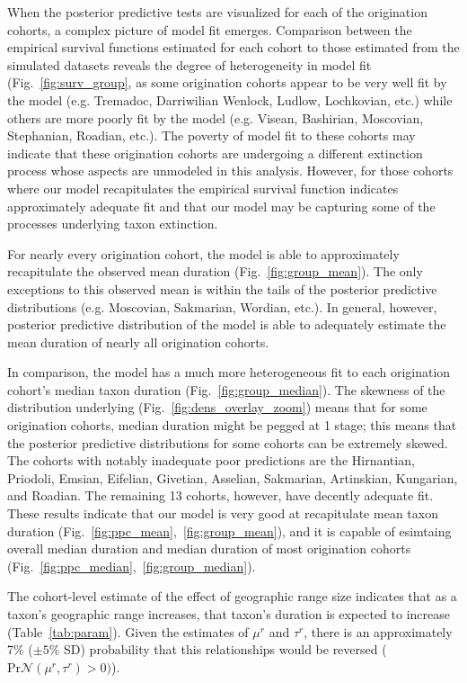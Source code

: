 \documentclass[11pt]{article}
\begin{document}
When the posterior predictive tests are visualized for each of the origination cohorts, a complex picture of model fit emerges. Comparison between the empirical survival functions estimated for each cohort to those estimated from the simulated datasets reveals the degree of heterogeneity in model fit (Fig.~\ref{fig:surv_group}, as some origination cohorts appear to be very well fit by the model (e.g. Tremadoc, Darriwilian Wenlock, Ludlow, Lochkovian, etc.) while others are more poorly fit by the model (e.g. Visean, Bashirian, Moscovian, Stephanian, Roadian, etc.). The poverty of model fit to these cohorts may indicate that these origination cohorts are undergoing a different extinction process whose aspects are unmodeled in this analysis. However, for those cohorts where our model recapitulates the empirical survival function indicates approximately adequate fit and that our model may be capturing some of the processes underlying taxon extinction.

For nearly every origination cohort, the model is able to approximately recapitulate the observed mean duration (Fig.~\ref{fig:group_mean}). The only exceptions to this observed mean is within the tails of the posterior predictive distributions (e.g. Moscovian, Sakmarian, Wordian, etc.). In general, however, posterior predictive distribution of the model is able to adequately estimate the mean duration of nearly all origination cohorts.

In comparison, the model has a much more heterogeneous fit to each origination cohort's median taxon duration (Fig.~\ref{fig:group_median}). The skewness of the distribution underlying (Fig.~\ref{fig:dens_overlay_zoom}) means that for some origination cohorts, median duration might be pegged at 1 stage; this means that the posterior predictive distributions for some cohorts can be extremely skewed. The cohorts with notably inadequate poor predictions are the Hirnantian, Priodoli, Emsian, Eifelian, Givetian, Asselian, Sakmarian, Artinskian, Kungarian, and Roadian. The remaining 13 cohorts, however, have decently adequate fit. These results indicate that our model is very good at recapitulate mean taxon duration (Fig.~\ref{fig:ppc_mean},~\ref{fig:group_mean}), and it is capable of esimtaing overall median duration and median duration of most origination cohorts (Fig.~\ref{fig:ppc_median},~\ref{fig:group_median}).




The cohort-level estimate of the effect of geographic range size indicates that as a taxon's geographic range increases, that taxon's duration is expected to increase (Table~\ref{tab:param}). Given the estimates of \(\mu^{r}\) and \(\tau^{r}\), there is an approximately 7\% (\(\pm 5\%\) SD) probability that this relationships would be reversed (\(\mathrm{Pr}\mathcal{N}(\mu^{r}, \tau^{r}) > 0)\)). 
\end{document}

